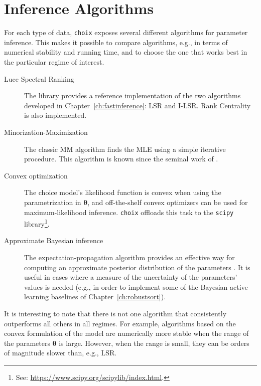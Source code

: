 \section{Inference Algorithms}

For each type of data, \texttt{choix} exposes several different algorithms for parameter inference.
This makes it possible to compare algorithms, e.g., in terms of numerical stability and running time, and to choose the one that works best in the particular regime of interest.

\begin{description}
\item[Luce Spectral Ranking] The library provides a reference implementation of the two algorithms developed in Chapter~\ref{ch:fastinference}: LSR and I-LSR.
Rank Centrality \citep{negahban2012iterative} is also implemented.

\item[Minorization-Maximization] The classic MM algorithm finds the MLE using a simple iterative procedure.
This algorithm is known since the seminal work of \citet{zermelo1928berechnung}.

\item[Convex optimization] The choice model's likelihood function is convex when using the parametrization in $\bm{\theta}$, and off-the-shelf convex optimizers can be used for maximum-likelihood inference.
\texttt{choix} offloads this task to the \texttt{scipy} library\footnote{%
See: \url{https://www.scipy.org/scipylib/index.html}.
}.

\item[Approximate Bayesian inference] The expectation-propagation algorithm provides an effective way for computing an approximate posterior distribution of the parameters \citep{minka2001family, chu2005gaussian}.
It is useful in cases where a measure of the uncertainty of the parameters' values is needed (e.g., in order to implement some of the Bayesian active learning baselines of Chapter~\ref{ch:robustsort}).
\end{description}

It is interesting to note that there is not one algorithm that consistently outperforms all others in all regimes.
For example, algorithms based on the convex formulation of the model are numerically more stable when the range of the parameters $\bm{\theta}$ is large.
However, when the range is small, they can be orders of magnitude slower than, e.g., LSR.
